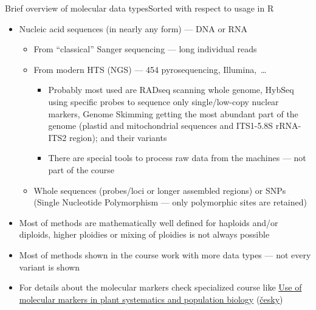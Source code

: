 \documentclass[compress, ucs, xelatex, 11pt, xcolor=svgnames,
  hyperref={
    bookmarks=true,
    unicode=true,
    colorlinks=true,
    pdftitle={Molecular data in R},
    plainpages=false,
    pdfauthor={Vojtech Zeisek},
    pdfsubject={Course about phylogeny and evolution in R},
    pdfcreator={XeLaTeX},
    pdfkeywords={R, evolution, phylogeny, molecular data},
    linkcolor=Tomato,
    anchorcolor=SaddleBrown,
    citecolor=Goldenrod,
    filecolor=DarkMagenta,
    menucolor=Sienna,
    urlcolor=DarkTurquoise,
    pdftex},
  url={hyphens, lowtilde} %
  ]{beamer}
\begin{document}
\begin{frame}[allowframebreaks]{Brief overview of molecular data types}{Sorted with respect to usage in R}
\begin{itemize}
    \begin{itemize}
      \item Apart similar usage as with DNA/RNA (sequence analysis) it is possible to work with the structure and conformation of the proteins
      \item R has plenty of packages for specialized protein analyses
    \end{itemize}
    \item Nucleic acid sequences (in nearly any form) --- DNA or RNA
    \begin{itemize}
      \item From ``classical'' Sanger sequencing --- long individual reads
      \item From modern HTS (NGS) --- 454 pyrosequencing, Illumina,~\ldots
	\begin{itemize}
	  \item Probably most used are RADseq scanning whole genome, HybSeq using specific probes to sequence only single/low-copy nuclear markers, Genome Skimming getting the most abundant part of the genome (plastid and mitochondrial sequences and ITS1-5.8S rRNA-ITS2 region); and their variants
	  \item There are special tools to process raw data from the machines --- not part of the course
	\end{itemize}
      \item Whole sequences (probes/loci or longer assembled regions) or SNPs (Single Nucleotide Polymorphism --- only polymorphic sites are retained)
    \end{itemize}
    \item Most of methods are mathematically well defined for haploids and/or diploids, higher ploidies or mixing of ploidies is not always possible
    \item Most of methods shown in the course work with more data types --- not every variant is shown
    \item For details about the molecular markers check specialized course like \href{https://is.cuni.cz/studium/eng/predmety/index.php?do=predmet&kod=MB120P44}{Use of molecular markers in plant systematics and population biology} (\href{https://is.cuni.cz/studium/predmety/index.php?do=predmet&kod=MB120P44}{česky})
  \end{itemize}
\end{frame}
\end{document}
